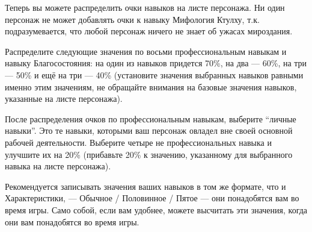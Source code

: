 \documentclass[letterpaper,twocolumn,openany, twoside, 11pt, usenames]{cocbook}
\begin{document}
Теперь вы можете распределить очки навыков на листе персонажа. Ни один персонаж не может добавлять очки к навыку Мифология Ктулху, т.к. подразумевается, что любой персонаж ничего не знает об ужасах мироздания.

Распределите следующие значения по восьми профессиональным навыкам и навыку Благосостояния: на один из навыков придется 70\%, на два --- 60\%, на три --- 50\% и ещё на три --- 40\% (установите значения выбранных навыков равными именно этим значениям, не обращайте внимания на базовые значения навыков, указанные на листе персонажа).

\smallbreak

\noindent {}

\smallbreak

После распределения очков по профессиональным навыкам, выберите ``личные навыки''. Это те навыки, которыми ваш персонаж овладел вне своей основной рабочей деятельности. Выберите четыре не профессиональных навыка и улучшите их на 20\% (прибавьте 20\% к значению, указанному для выбранного навыка на листе персонажа).

Рекомендуется записывать значения ваших навыков в том же формате, что и Характеристики, ---  Обычное / Половинное / Пятое --- они понадобятся вам во время игры. Само собой, если вам удобнее, можете высчитать эти значения, когда они вам понадобятся во время игры.

\smallbreak
\end{document}
